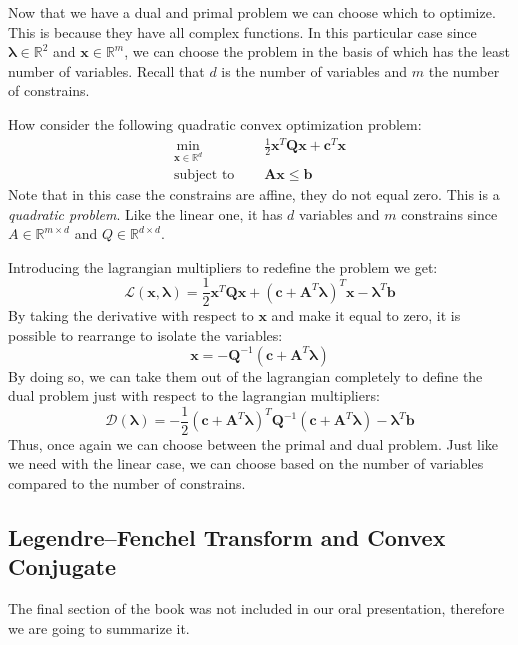 \documentclass[]{article}
\theoremstyle{definition}
\begin{document}
Now that we have a dual and primal problem we can choose which to optimize. This is because they have all complex functions. In this particular case since $\boldsymbol{\lambda}\in\mathbb{R}^2$ and $\boldsymbol{x}\in\mathbb{R}^m$, we can choose the problem in the basis of which has the least number of variables. Recall that $d$ is the number of variables and $m$ the number of constrains. 

How consider the following quadratic convex optimization problem:
\begin{align*}
	\min_{\boldsymbol{x}\in\mathbb{R}^d}\quad  &\frac12 \boldsymbol{x}^T\boldsymbol{Q}\boldsymbol{x} + \boldsymbol{c}^T\boldsymbol{x} \\
\text{subject to }\quad  &\boldsymbol{A}\boldsymbol{x}\leq \boldsymbol{b}
\end{align*}
Note that in this case the constrains are affine, they do not equal zero. This is a \textit{quadratic problem}. Like the linear one, it has $d$ variables and $m$ constrains since $A\in\mathbb{R}^{m\times d}$ and $Q\in\mathbb{R}^{d\times d}$.

Introducing the lagrangian multipliers to redefine the problem we get:
\begin{equation*}
	\mathcal{L}(\boldsymbol{x}, \boldsymbol{\lambda}) = \frac12 \boldsymbol{x}^T \boldsymbol{Q}\boldsymbol{x} + (\boldsymbol{c} + \boldsymbol{A}^T\boldsymbol{\lambda})^T\boldsymbol{x} - \boldsymbol{\lambda}^T \boldsymbol{b}
\end{equation*}
By taking the derivative with respect to $\boldsymbol{x}$ and make it equal to zero, it is possible to rearrange to isolate the variables:
\begin{equation*}
	\boldsymbol{x} = -\boldsymbol{Q}^{-1}(\boldsymbol{c} + \boldsymbol{A}^T\boldsymbol{\lambda})
\end{equation*}
By doing so, we can take them out of the lagrangian completely to define the dual problem just with respect to the lagrangian multipliers:
\begin{equation*}
	\mathcal{D}(\boldsymbol{\lambda}) = -\frac12 (\boldsymbol{c}+ \boldsymbol{A}^T\boldsymbol{\lambda})^T \boldsymbol{Q}^{-1}(\boldsymbol{c} +  \boldsymbol{A}^T\boldsymbol{\lambda}) - \boldsymbol{\lambda}^T \boldsymbol{b}
\end{equation*}
Thus, once again we can choose between the primal and dual problem. Just like we need with the linear case, we can choose based on the number of variables compared to the number of constrains. 

\subsection{Legendre–Fenchel Transform and Convex Conjugate}
The final section of the book was not included in our oral presentation, therefore we are going to summarize it.
\end{document}

